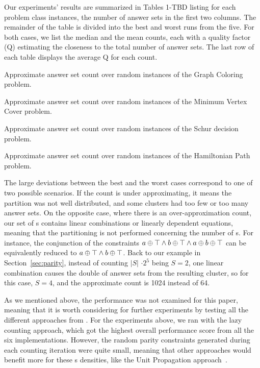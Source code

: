 Our experiments' results are summarized in Tables 1-TBD listing for each problem class instances, the number of answer sets in the first two columns.
The remainder of the table is divided into the best and worst runs from the five. 
%
For both cases, we list the median and the mean counts, each with a quality factor (Q) estimating the closeness to the total number of answer sets.
The last row of each table displays the average Q for each count.

\begin{table*}[t]
  \centering
  
  \caption{Approximate answer set count over random instances of the Graph Coloring problem.}\label{table:graph_color}
\end{table*}


\begin{table*}[t]
  \centering
  
  \caption{Approximate answer set count over random instances of the Minimum Vertex Cover problem.}\label{table:min_vertex_cover}
\end{table*}

\begin{table*}[t]
  \centering
  
  \caption{Approximate answer set count over random instances of the Schur decision problem.}\label{table:schur}
\end{table*}


\begin{table*}[t]
  \centering
  
  \caption{Approximate answer set count over random instances of the Hamiltonian Path problem.}\label{table:hampath}
\end{table*}




The large deviations between the best and the worst cases correspond to one of two possible scenarios.
%
If the count is under approximating,
it means the partition was not well distributed, and some clusters had too few or too many answer sets. 
%
On the opposite case, where there is an over-approximation count,
our set of \XOR{}s contains linear combinations or linearly dependent equations,
meaning that the partitioning is not performed concerning the number of \XOR{}s.
% 
For instance, the conjunction of the \XOR{} constraints $a \oplus \top \land b \oplus \top \land a \oplus b \oplus \top$ can be equivalently reduced to $a \oplus \top \land b \oplus \top$. 
%
Back to our example in Section~\ref{sec:parity}, instead of counting $|S|$ $\cdot 2^5$ being $S=2$,
one linear combination causes the double of answer sets from the resulting cluster, so for this case, $S=4$, and the approximate count is 1024 instead of 64. 



As we mentioned above, the performance was not examined for this paper,
meaning that it is worth considering for further experiments by testing all the different approaches from \xorro{}.
For the experiments above, we ran \xorro{} with the lazy counting approach,
which got the highest overall performance score from all the six implementations.
However, the random parity constraints generated during each counting iteration were quite small,
meaning that other approaches would benefit more for these \XOR{}s densities, like the Unit Propagation approach~\cite{DBLP:conf/lpnmr/EverardoJKS19}.